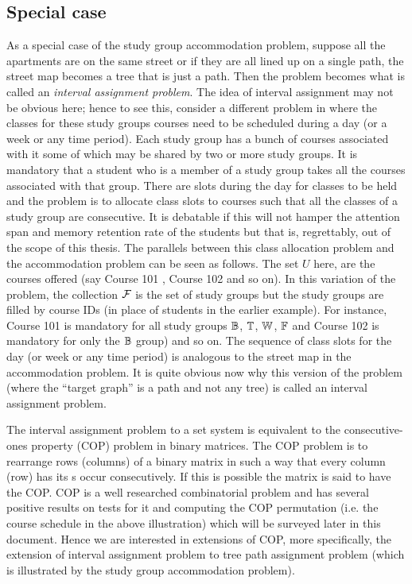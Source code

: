 \subsection{Special case}
\label{sec:courseschedule}
As a special case of the study group accommodation problem, suppose
all the apartments are on the same street or if they are all lined up
on a single path, the street map becomes a tree that is just a
path. Then the problem becomes what is called an {\em interval
  assignment problem}. The idea of interval assignment may not be
obvious here; hence to see this, consider a different problem in
{\WSI} where the classes for these study groups courses need to be
scheduled during a day (or a week or any time period). Each study
group has a bunch of courses associated with it some of which may be
shared by two or more study groups. It is mandatory that a student who
is a member of a study group takes all the courses associated with
that group. There are slots during the day for classes to be held and
the problem is to allocate class slots to courses such that all the
classes of a study group are consecutive. It is debatable if this will
not hamper the attention span and memory retention rate of the
students but that is, regrettably, out of the scope of this
thesis. The parallels between this class allocation problem and the
accommodation problem can be seen as follows. The set $U$ here, are
the courses offered (say Course 101 {\coneohone}, Course 102
{\coneohtwo} and so on). In this variation of the problem, the
collection ${\cal F}$ is the set of study groups but the study groups are
filled by course IDs (in place of students in the earlier
example). For instance, Course 101 is mandatory for all study groups
$\mathbb{B}$, $\mathbb{T}$, $\mathbb{W}$, $\mathbb{F}$ and Course 102 is mandatory for
only the $\mathbb{B}$ group) and so on. The sequence of class slots for the
day (or week or any time period) is analogous to the street map in the
accommodation problem. It is quite obvious now why this version of the
problem (where the ``target graph'' is a path and not any
tree) is called an interval assignment
problem.

The interval assignment problem to a set system is equivalent to the
consecutive-ones property (COP) problem in binary matrices\cite{wlh02,
  nsnrs09}.  The COP problem is to rearrange rows (columns) of a
binary matrix in such a way that every column (row) has its {\un}s
occur consecutively. If this is possible the matrix is said to have
the COP.  COP is a well researched combinatorial problem and has
several positive results on tests for it and computing the COP
permutation (i.e. the course schedule in the above illustration) which
will be surveyed later in this document. Hence we are interested in
extensions of COP, more specifically, the extension of interval
assignment problem to tree path assignment problem (which is
illustrated by the study group accommodation problem).


